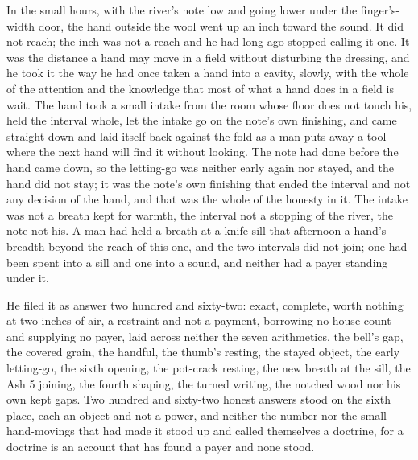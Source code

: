 In the small hours, with the river's note low and going lower under the finger's-width door, the hand outside the wool went up an inch toward the sound. It did not reach; the inch was not a reach and he had long ago stopped calling it one. It was the distance a hand may move in a field without disturbing the dressing, and he took it the way he had once taken a hand into a cavity, slowly, with the whole of the attention and the knowledge that most of what a hand does in a field is wait. The hand took a small intake from the room whose floor does not touch his, held the interval whole, let the intake go on the note's own finishing, and came straight down and laid itself back against the fold as a man puts away a tool where the next hand will find it without looking. The note had done before the hand came down, so the letting-go was neither early again nor stayed, and the hand did not stay; it was the note's own finishing that ended the interval and not any decision of the hand, and that was the whole of the honesty in it. The intake was not a breath kept for warmth, the interval not a stopping of the river, the note not his. A man had held a breath at a knife-sill that afternoon a hand's breadth beyond the reach of this one, and the two intervals did not join; one had been spent into a sill and one into a sound, and neither had a payer standing under it.

He filed it as answer two hundred and sixty-two: exact, complete, worth nothing at two inches of air, a restraint and not a payment, borrowing no house count and supplying no payer, laid across neither the seven arithmetics, the bell's gap, the covered grain, the handful, the thumb's resting, the stayed object, the early letting-go, the sixth opening, the pot-crack resting, the new breath at the sill, the Ash 5 joining, the fourth shaping, the turned writing, the notched wood nor his own kept gaps. Two hundred and sixty-two honest answers stood on the sixth place, each an object and not a power, and neither the number nor the small hand-movings that had made it stood up and called themselves a doctrine, for a doctrine is an account that has found a payer and none stood.

